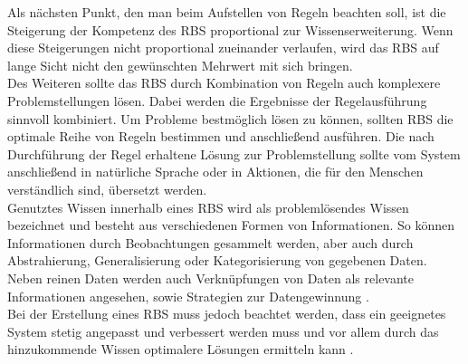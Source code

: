 Als nächsten Punkt, den man beim Aufstellen von Regeln beachten soll, ist die Steigerung der Kompetenz des \ac{RBS} proportional zur Wissenserweiterung. Wenn diese Steigerungen nicht proportional zueinander verlaufen, wird das \ac{RBS} auf lange Sicht nicht den gewünschten Mehrwert mit sich bringen.\\
Des Weiteren sollte das \ac{RBS} durch Kombination von Regeln auch komplexere Problemstellungen lösen. Dabei werden die Ergebnisse der Regelausführung sinnvoll kombiniert. Um Probleme bestmöglich lösen zu können, sollten \ac{RBS} die optimale Reihe von Regeln bestimmen und anschließend ausführen. Die nach Durchführung der Regel erhaltene Lösung zur Problemstellung sollte vom System anschließend in natürliche Sprache oder in Aktionen, die für den Menschen verständlich sind, übersetzt werden.\\
Genutztes Wissen innerhalb eines \ac{RBS} wird als problemlösendes Wissen bezeichnet und besteht aus verschiedenen Formen von Informationen. So können Informationen durch Beobachtungen gesammelt werden, aber auch durch Abstrahierung, Generalisierung oder Kategorisierung von gegebenen Daten. Neben reinen Daten werden auch Verknüpfungen von Daten als relevante Informationen angesehen, sowie Strategien zur Datengewinnung \cite{Hayes-Roth:1985:RS:4284.4286}.\\
Bei der Erstellung eines \ac{RBS} muss jedoch beachtet werden, dass ein geeignetes System stetig angepasst und verbessert werden muss und vor allem durch das hinzukommende Wissen optimalere Lösungen ermitteln kann \cite{Hayes-Roth:1985:RS:4284.4286}.



